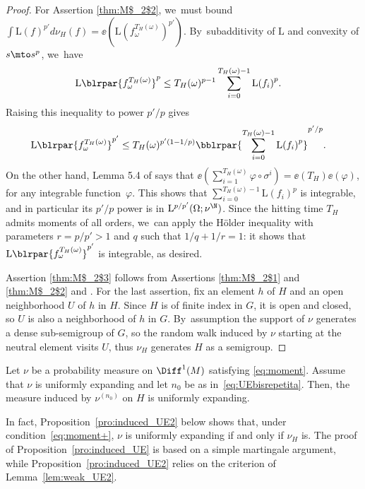 \begin{proof}
For Assertion \eqref{thm:M$_2$2}, we~must bound
$\int \mathrm L(f)^{p'} d\nu_H(f)= \ee ( \mathrm L(f_\omega^{T_H(\omega)})^{p'} )$. By~subadditivity of $\mathrm L$ and convexity of $s\mto s^{p}$, we~have
\begin{align*} \label{eq:int_T}
\mathrm L\blrpar{f_\omega^{T_H(\omega)}}^{p}
& \leq T_H(\omega)^{p-1} \sum_{i=0}^{T_H(\omega)-1} {\mathrm L(f_i)}^{p}.
\end{align*}
Raising this inequality to power $p'/p$ gives
\begin{align*}
\mathrm L\blrpar{f_\omega^{T_H(\omega)}}^{p'} & \leq T_H(\omega)^{p'(1-1/p)}
\bblrpar{\sum_{i=0}^{T_H(\omega)-1} {\mathrm L(f_i)}^{p}}^{p'/p}.
\end{align*}
On the other hand, Lemma 5.4 of \cite{benoist-quint_book} says that $\ee(\sum_{i=1}^{T_H(\omega)}\varphi \circ\sigma^i ) = \ee(T_H)\ee(\varphi)$, for any integrable function~$\varphi$. This shows that $\sum_{i=0}^{T_H(\omega)-1} {\mathrm L(f_i)}^{p}$ is integrable, and in particular its $p'/p$ power
is in $\mathrm L^{p/p'}(\Omega; \nu^\N)$. Since the hitting time $T_H$ admits moments of all orders, we~can apply the Hölder
inequality with parameters $r=p/p'>1$ and $q$ such that $1/q+1/r=1$: it shows that $\mathrm L\blrpar{f_\omega^{T_H(\omega)}}^{p'} $ is integrable, as desired.

Assertion \eqref{thm:M$_2$3} follows from Assertions \eqref{thm:M$_2$1} and \eqref{thm:M$_2$2} and \cite[Cor.\,5.6]{benoist-quint_book}.
For the last assertion, fix an element $h$ of $H$ and an open neighborhood $U$ of $h$ in $H$.
Since $H$ is of finite index in $G$, it is open and closed, so $U$ is also a neighborhood of $h$ in $G$. By~assumption the support of $\nu$ generates a dense sub-semigroup of
$G$, so the random walk induced by $\nu$ starting at the neutral element visits $U$,
thus $\nu_H$ generates $H$ as a semigroup. \end{proof}


\begin{pro}\label{pro:induced_UE}
Let $\nu$ be a probability measure on $\Diff^1(M)$ satisfying \eqref{eq:moment}. Assume that $\nu$ is uniformly expanding and
let $n_0$ be as in~\eqref{eq:UEbisrepetita}. Then, the measure induced by
$\nu^{(n_0)}$ on $H$ is uniformly expanding.
\end{pro}

In fact,
Proposition~\ref{pro:induced_UE2} below shows that, under condition~\eqref{eq:moment+}, $\nu$ is uniformly expanding if
and only if $\nu_H$ is. The proof of Proposition~\ref{pro:induced_UE} is based on a simple martingale argument, while
Proposition~\ref{pro:induced_UE2} relies on the criterion of Lemma~\ref{lem:weak_UE2}.

